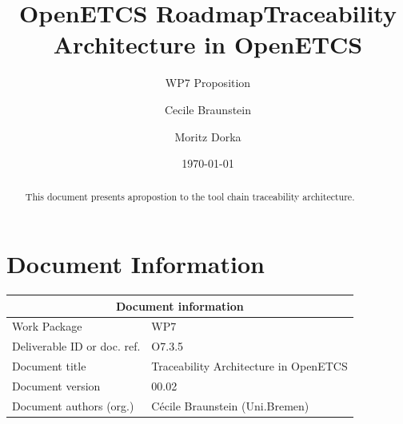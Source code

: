 \documentclass[11pt]{template/openetcs_report}
\begin{document}
\frontmatter
{}




\title{OpenETCS Roadmap}




\date{\today}
\title{Traceability Architecture in OpenETCS}
\subtitle{WP7 Proposition}

\techassessorname{}
\techassessoraffil{}

\qualityassessorname{}
\qualityassessoraffil{}

\approvalname{}
\approvalaffil{}
\author{Cecile Braunstein}

\author{Moritz Dorka}





\begin{abstract}
This document presents  apropostion to the tool chain traceability
architecture.
\end{abstract}


\maketitle
\tableofcontents

\newpage

\chapter{Document Information}

\begin{tabular}{|p{4.4cm}|p{8.7cm}|}
\hline
\multicolumn{2}{|c|}{Document information} \\
\hline
Work Package &  WP7  \\
Deliverable ID or doc. ref. & O7.3.5\\
\hline
Document title &Traceability Architecture in OpenETCS \\
Document version & 00.02 \\
Document authors (org.)  & Cécile Braunstein (Uni.Bremen) \\
\hline
\end{tabular}
\end{document}
